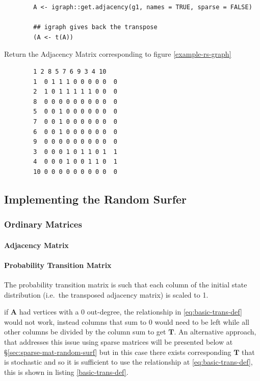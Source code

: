 \documentclass[11pt]{report}
\begin{document}
\begin{listing}[htbp]
    \begin{tcolorbox}
        \begin{verbatim}
        A <- igraph::get.adjacency(g1, names = TRUE, sparse = FALSE)

        ## igraph gives back the transpose
        (A <- t(A))
        \end{verbatim}
        \caption{\label{adj-mat-random-surf}Return the Adjacency Matrix corresponding to figure \ref{example-rs-graph}}
    \tcblower
        \begin{verbatim}
        1 2 8 5 7 6 9 3 4 10
        1  0 1 1 1 0 0 0 0 0  0
        2  1 0 1 1 1 1 1 0 0  0
        8  0 0 0 0 0 0 0 0 0  0
        5  0 0 1 0 0 0 0 0 0  0
        7  0 0 1 0 0 0 0 0 0  0
        6  0 0 1 0 0 0 0 0 0  0
        9  0 0 0 0 0 0 0 0 0  0
        3  0 0 0 1 0 1 1 0 1  1
        4  0 0 0 1 0 0 1 1 0  1
        10 0 0 0 0 0 0 0 0 0  0
        \end{verbatim}
    \end{tcolorbox}
\end{listing}



\subsection{Implementing the Random Surfer}
\label{sec:orgb756c9c}
\subsubsection{Ordinary Matrices}
\label{implementing-page-rank-methods}
\paragraph{Adjacency Matrix}
\label{adjacency-matrix}

\paragraph{Probability Transition Matrix}
\label{probability-transition-matrix}
The probability transition matrix is such that each column of the
initial state distribution (i.e. the transposed adjacency matrix) is
scaled to 1.

if \(\mathbf{A}\) had vertices with a 0 out-degree, the relationship in
\eqref{eq:basic-trans-def} would not work, instead columns that sum to 0 would
need to be left while all other columns be divided by the column sum to get
\(\mathbf{T}\). An alternative approach, that addresses this issue using sparse
matrices will be presented below at \S \ref{sec:sparse-mat-random-surf} but in
this case there exists corresponding \(\mathbf{T}\) that is stochastic and so it
is sufficient to use the relationship at \eqref{eq:basic-trans-def}, this is
shown in listing \ref{basic-trans-def}.
\end{document}
